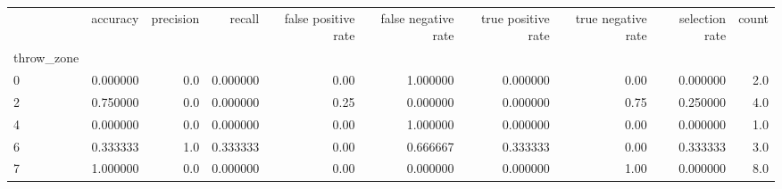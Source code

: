 \begin{tabular}{lrrrrrrrrr}
\toprule
{} &  accuracy &  precision &    recall &  false positive rate &  false negative rate &  true positive rate &  true negative rate &  selection rate &  count \\
throw\_zone &           &            &           &                      &                      &                     &                     &                 &        \\
\midrule
0          &  0.000000 &        0.0 &  0.000000 &                 0.00 &             1.000000 &            0.000000 &                0.00 &        0.000000 &    2.0 \\
2          &  0.750000 &        0.0 &  0.000000 &                 0.25 &             0.000000 &            0.000000 &                0.75 &        0.250000 &    4.0 \\
4          &  0.000000 &        0.0 &  0.000000 &                 0.00 &             1.000000 &            0.000000 &                0.00 &        0.000000 &    1.0 \\
6          &  0.333333 &        1.0 &  0.333333 &                 0.00 &             0.666667 &            0.333333 &                0.00 &        0.333333 &    3.0 \\
7          &  1.000000 &        0.0 &  0.000000 &                 0.00 &             0.000000 &            0.000000 &                1.00 &        0.000000 &    8.0 \\
\bottomrule
\end{tabular}
